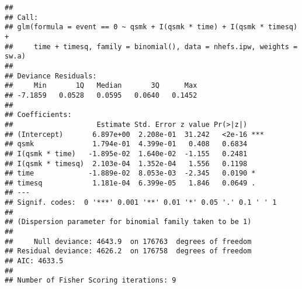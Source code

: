 \documentclass[10pt,]{book}
\begin{document}
\begin{verbatim}
## 
## Call:
## glm(formula = event == 0 ~ qsmk + I(qsmk * time) + I(qsmk * timesq) + 
##     time + timesq, family = binomial(), data = nhefs.ipw, weights = sw.a)
## 
## Deviance Residuals: 
##     Min       1Q   Median       3Q      Max  
## -7.1859   0.0528   0.0595   0.0640   0.1452  
## 
## Coefficients:
##                    Estimate Std. Error z value Pr(>|z|)    
## (Intercept)       6.897e+00  2.208e-01  31.242   <2e-16 ***
## qsmk              1.794e-01  4.399e-01   0.408   0.6834    
## I(qsmk * time)   -1.895e-02  1.640e-02  -1.155   0.2481    
## I(qsmk * timesq)  2.103e-04  1.352e-04   1.556   0.1198    
## time             -1.889e-02  8.053e-03  -2.345   0.0190 *  
## timesq            1.181e-04  6.399e-05   1.846   0.0649 .  
## ---
## Signif. codes:  0 '***' 0.001 '**' 0.01 '*' 0.05 '.' 0.1 ' ' 1
## 
## (Dispersion parameter for binomial family taken to be 1)
## 
##     Null deviance: 4643.9  on 176763  degrees of freedom
## Residual deviance: 4626.2  on 176758  degrees of freedom
## AIC: 4633.5
## 
## Number of Fisher Scoring iterations: 9
\end{verbatim}
\end{document}
